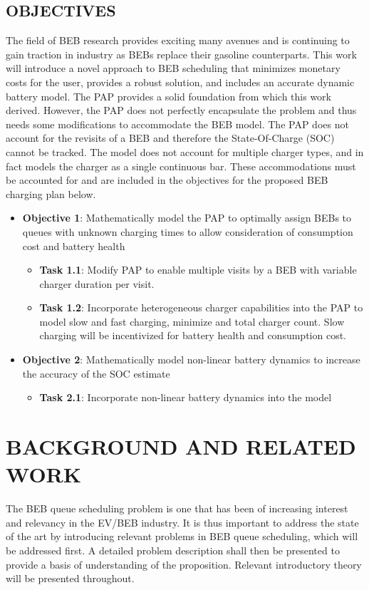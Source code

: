 \documentclass[ee,thesis]{usuthesis}
\begin{document}
\section{OBJECTIVES}
\label{sec:objectives}
The field of BEB research provides exciting many avenues and is continuing to gain traction in industry as BEBs replace
their gasoline counterparts. This work will introduce a novel approach to BEB scheduling that minimizes monetary costs
for the user, provides a robust solution, and includes an accurate dynamic battery model. The PAP provides a solid
foundation from which this work derived. However, the PAP does not perfectly encapsulate the problem and thus needs some
modifications to accommodate the BEB model. The PAP does not account for the revisits of a BEB and therefore the
State-Of-Charge (SOC) cannot be tracked. The model does not account for multiple charger types, and in fact models the
charger as a single continuous bar. These accommodations must be accounted for and are included in the objectives for
the proposed BEB charging plan below.

\begin{itemize}
\item \textbf{Objective 1}: Mathematically model the PAP to optimally assign BEBs to queues with unknown charging times to allow consideration of consumption cost and battery health

\begin{itemize}
\item \textbf{Task 1.1}: Modify PAP to enable multiple visits by a BEB with variable charger duration per visit.

\item \textbf{Task 1.2}: Incorporate heterogeneous charger capabilities into the PAP to model slow and fast charging, minimize
and total charger count. Slow charging will be incentivized for battery health and consumption cost.
\end{itemize}

\item \textbf{Objective 2}: Mathematically model non-linear battery dynamics to increase the accuracy of the SOC estimate

\begin{itemize}
\item \textbf{Task 2.1}: Incorporate non-linear battery dynamics into the model
\end{itemize}
\end{itemize}
\chapter{BACKGROUND AND RELATED WORK}
\label{sec:background-and-related-work}
The BEB queue scheduling problem is one that has been of increasing interest and relevancy in the EV/BEB industry. It is
thus important to address the state of the art by introducing relevant problems in BEB queue scheduling, which will be
addressed first. A detailed problem description shall then be presented to provide a basis of understanding of the
proposition. Relevant introductory theory will be presented throughout.
\end{document}
